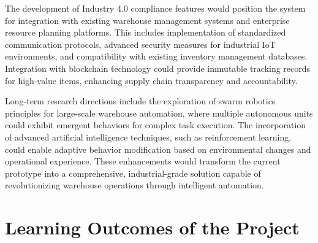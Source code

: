 The development of Industry 4.0 compliance features would position the system for integration with existing warehouse management systems and enterprise resource planning platforms. This includes implementation of standardized communication protocols, advanced security measures for industrial IoT environments, and compatibility with existing inventory management databases. Integration with blockchain technology could provide immutable tracking records for high-value items, enhancing supply chain transparency and accountability.

Long-term research directions include the exploration of swarm robotics principles for large-scale warehouse automation, where multiple autonomous units could exhibit emergent behaviors for complex task execution. The incorporation of advanced artificial intelligence techniques, such as reinforcement learning, could enable adaptive behavior modification based on environmental changes and operational experience. These enhancements would transform the current prototype into a comprehensive, industrial-grade solution capable of revolutionizing warehouse operations through intelligent automation.

\section{Learning Outcomes of the Project}

